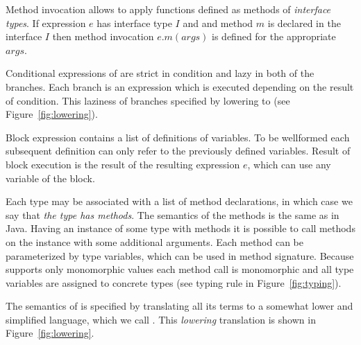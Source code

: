 Method invocation allows to apply functions defined as methods of
\emph{interface types}. If expression $e$ has interface type $I$ and and
method $m$ is declared in the interface $I$ then method invocation
$e.m(args)$ is defined for the appropriate $args$.

Conditional expressions of \langname are strict in condition and lazy in both
of the branches. Each branch is an expression which is executed depending on
the result of condition. This laziness of branches specified by lowering to
\corelang (see Figure~\ref{fig:lowering}).

Block expression contains a list of  definitions of variables. To be
wellformed each subsequent definition can only refer to the previously defined
variables. Result of block execution is the result of the resulting
expression $e$, which can use any variable of the block.

Each type may be associated with a list of method declarations, in which case
we say that \emph{the type has methods}. The semantics of the methods is the
same as in Java. Having an instance of some type with methods it is possible
to call methods on the instance with some additional arguments.
Each method can be parameterized by type variables, which
can be used in method signature. Because \langname supports only monomorphic
values each method call is monomorphic and all type variables are assigned to
concrete types (see  typing rule in Figure~\ref{fig:typing}).

The semantics of \langname is specified by translating all its terms to a
somewhat lower and simplified language, which we call \corelang. This
\emph{lowering} translation is shown in Figure~\ref{fig:lowering}. 

